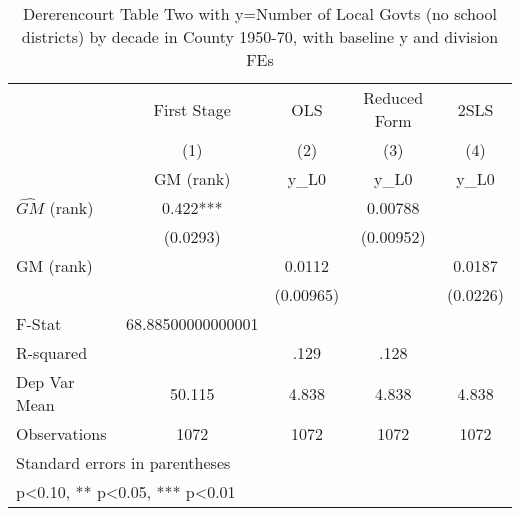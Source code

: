 \begin{table}[htbp]\centering
\def\sym#1{\ifmmode^{#1}\else\(^{#1}\)\fi}
\caption{Dererencourt Table Two with y=Number of Local Govts (no school districts) by decade in County 1950-70, with baseline y and division FEs}
\begin{tabular}{l*{4}{c}}
\toprule
                    & First Stage   &         OLS   &Reduced Form   &        2SLS   \\
                    &\multicolumn{1}{c}{(1)}&\multicolumn{1}{c}{(2)}&\multicolumn{1}{c}{(3)}&\multicolumn{1}{c}{(4)}\\
                    &\multicolumn{1}{c}{GM  (rank)}&\multicolumn{1}{c}{y\_L0}&\multicolumn{1}{c}{y\_L0}&\multicolumn{1}{c}{y\_L0}\\
\midrule
$\hat{GM}$ (rank)   &       0.422***&               &     0.00788   &               \\
                    &    (0.0293)   &               &   (0.00952)   &               \\
\addlinespace
GM  (rank)          &               &      0.0112   &               &      0.0187   \\
                    &               &   (0.00965)   &               &    (0.0226)   \\
\midrule
F-Stat              &68.88500000000001   &               &               &               \\
R-squared           &               &        .129   &        .128   &               \\
Dep Var Mean        &      50.115   &       4.838   &       4.838   &       4.838   \\
Observations        &        1072   &        1072   &        1072   &        1072   \\
\bottomrule
\multicolumn{5}{l}{\footnotesize Standard errors in parentheses}\\
\multicolumn{5}{l}{\footnotesize * p<0.10, ** p<0.05, *** p<0.01}\\
\end{tabular}
\end{table}
